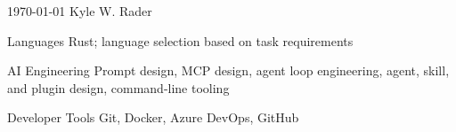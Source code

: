 \documentclass[11pt, a4paper]{awesome-cv}
\begin{document}
\makecvheader

\makecvfooter
  {\today}
  {Kyle W. Rader}
  {\thepage}

\begin{cvskills}
  \cvskill
    {Languages}
    {Rust; language selection based on task requirements}

  \cvskill
    {AI Engineering}
    {Prompt design, MCP design, agent loop engineering, agent, skill, and plugin design, command-line tooling}

  \cvskill
    {Developer Tools}
    {Git, Docker, Azure DevOps, GitHub}
\end{cvskills}
\end{document}
